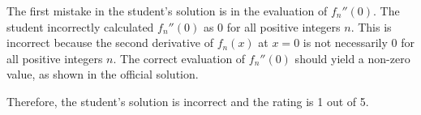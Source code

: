 The first mistake in the student's solution is in the evaluation of $f_n''(0)$. The student incorrectly calculated $f_n''(0)$ as 0 for all positive integers $n$. This is incorrect because the second derivative of $f_n(x)$ at $x=0$ is not necessarily 0 for all positive integers $n$. The correct evaluation of $f_n''(0)$ should yield a non-zero value, as shown in the official solution.

Therefore, the student's solution is incorrect and the rating is 1 out of 5.
